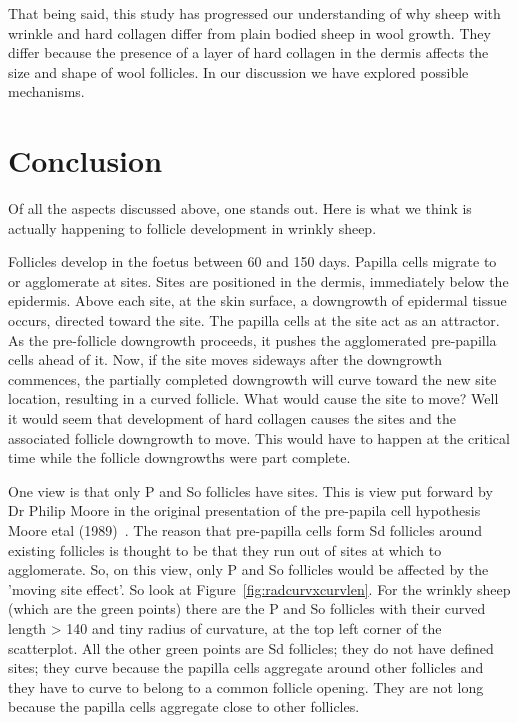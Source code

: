 \documentclass[titlepage]{article}  %
\begin{document}
That being said, this study has progressed our understanding of why sheep with wrinkle and hard collagen differ from plain bodied sheep in wool growth. They differ because the presence of a layer of hard collagen in the dermis affects the size and shape of wool follicles. In our discussion we have explored possible mechanisms.

\section{Conclusion}
Of all the aspects discussed above, one stands out. Here is what we think is actually happening to follicle development in wrinkly sheep.

Follicles develop in the foetus between 60 and 150 days. Papilla cells migrate to  or agglomerate at sites. Sites are  positioned in the dermis, immediately below the epidermis. Above each site, at the skin surface, a downgrowth of epidermal tissue occurs, directed toward the site. The papilla cells at the site act as an attractor.  As the pre-follicle downgrowth proceeds, it pushes the agglomerated pre-papilla cells ahead of it. Now, if the site moves sideways after the downgrowth commences, the partially completed downgrowth will curve toward the new site location, resulting in a curved follicle.  What would cause the site to move?  Well  it would seem that development of hard collagen causes the sites  and the associated follicle downgrowth to move. This would have to happen at the critical time while the follicle downgrowths were part complete.

One view is that only P and So follicles have sites. This is view put forward by Dr Philip Moore in the original presentation of the pre-papila cell hypothesis Moore etal (1989)~\cite{moor:89}. The reason that pre-papilla cells form Sd follicles around existing follicles is thought to be that they run out of sites at which to agglomerate. So, on this view,  only P and So follicles would be affected by the 'moving site effect'. So look at Figure~\ref{fig:radcurvxcurvlen}. For the wrinkly sheep  (which are the green points) there are the P and So follicles with their curved length > 140 and tiny radius of curvature, at the top left corner of the scatterplot. All the other green points are Sd follicles; they do not have defined sites; they curve because the papilla cells aggregate around other follicles and they have to curve to belong to a common follicle opening. They are not long because the papilla cells aggregate close to other follicles.
\end{document}
